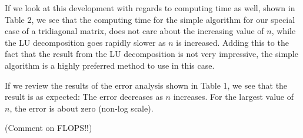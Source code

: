 \documentclass{article}
\begin{document}
\begin{multicols}{2}
If we look at this development with regards to computing time as well, shown in Table 2, we see that the computing time for the simple algorithm for our special case of a tridiagonal matrix, does not care about the increasing value of $n$, while the LU decomposition goes rapidly slower as $n$ is increased. Adding this to the fact that the result from the LU decomposition is not very impressive, the simple algorithm is a highly preferred method to use in this case.

If we review the results of the error analysis shown in Table 1, we see that the result is as expected: The error decreases as $n$ increases. For the largest value of $n$, the error is about zero (non-log scale).

(Comment on FLOPS!!)

\end{multicols}
\end{document}
